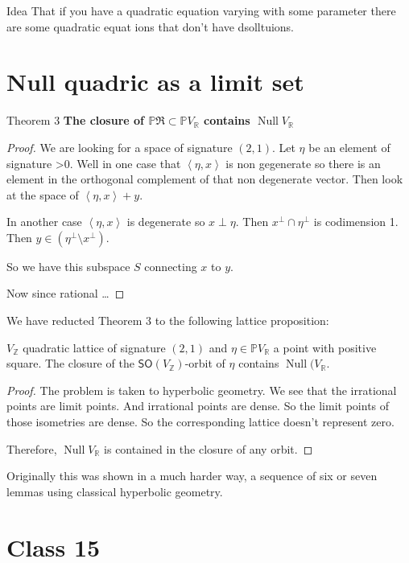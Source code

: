 \begin{idea1}{Idea}\leavevmode
	That if you have a quadratic equation varying with some parameter there are some quadratic equat ions that don't have dsolltuions.
\end{idea1}

\section{Null quadric as a limit set}

\begin{idea3}{Theorem 3}\leavevmode
	\textbf{The closure of $\mathbb{P}\mathfrak{R}\subset \mathbb{P}V_\mathbb{R}$ contains $\operatorname{N u l l}V_{\mathbb{R}}$} 
\end{idea3}

\begin{proof}\leavevmode
	We are looking for a space of signature $(2,1)$. Let  $\eta$ be an element of signature >0. Well in one case that $\left<\eta,x\right> $ is non gegenerate so there is an element in the orthogonal complement of that non degenerate vector. Then look at the space of $\left<\eta,x\right> +y$.

	In another case $\left<\eta,x\right> $ is degenerate so $x\perp \eta$. Then $x^\perp \cap \eta^\perp$ is codimension 1. Then $y\in(\eta^\perp \setminus x^\perp )$.

	So we have this subspace $S$ connecting $ x$ to $y$.

	Now since rational …
\end{proof}

We have reducted Theorem 3 to the following lattice proposition:

\begin{prop}\leavevmode
	$V_\mathbb{Z}$ quadratic lattice of signature $(2,1)$ and  $\eta\in\mathbb{P}V_\mathbb{R}$ a point with positive square. The closure of the $\mathsf{SO}(V_\mathbb{Z})$-orbit of $\eta$ contains $\operatorname{Nu ll}(V_{\mathbb{R}}$. 
\end{prop}

\begin{proof}\leavevmode
	The problem is taken to hyperbolic geometry. {\color{8}We see that the irrational points are limit points.} And irrational points are dense. So the limit points of those isometries are dense. So the corresponding lattice doesn't represent zero.

	Therefore, $\operatorname{Nul l}V_{\mathbb{R}}$ is contained in the closure of any orbit.
\end{proof}

\begin{remark}\leavevmode
	Originally this was shown in a much harder way, a sequence of six or seven lemmas using classical hyperbolic geometry.
\end{remark}


\section{Class 15}


